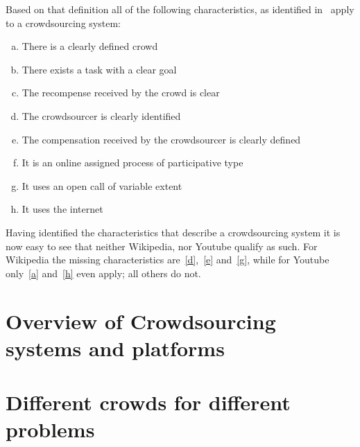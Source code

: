 \documentclass{sig-alternate}
\begin{document}
Based on that definition all of the following characteristics, as identified
in~\cite{estelles2012towards} apply to a crowdsourcing system:

\begin{enumerate}[(a)]
	\item There is a clearly defined crowd\label{a}
	\item There exists a task with a clear goal\label{b}
	\item The recompense received by the crowd is clear\label{c}
	\item The crowdsourcer is clearly identified\label{d}
	\item The compensation received by the crowdsourcer is clearly defined\label{e}
	\item It is an online assigned process of participative type\label{f}
	\item It uses an open call of variable extent\label{g}
	\item It uses the internet\label{h}
\end{enumerate}

Having identified the characteristics that describe a crowdsourcing system it
is now easy to see that neither Wikipedia, nor Youtube qualify as such. For
Wikipedia the missing characteristics are~\ref{d},~\ref{e} and~\ref{g},
while for Youtube only~\ref{a} and~\ref{h} even apply; all others do not.


\section{Overview of Crowdsourcing systems and platforms}

\section{Different crowds for different problems}
\end{document}
